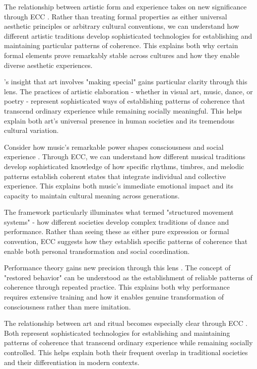 The relationship between artistic form and experience takes on new significance through ECC \cite{kaeppler1985structured}. Rather than treating formal properties as either universal aesthetic principles or arbitrary cultural conventions, we can understand how different artistic traditions develop sophisticated technologies for establishing and maintaining particular patterns of coherence. This explains both why certain formal elements prove remarkably stable across cultures and how they enable diverse aesthetic experiences.

\cite{dissanayake1992homo}'s insight that art involves "making special" gains particular clarity through this lens. The practices of artistic elaboration - whether in visual art, music, dance, or poetry - represent sophisticated ways of establishing patterns of coherence that transcend ordinary experience while remaining socially meaningful. This helps explain both art's universal presence in human societies and its tremendous cultural variation.

Consider how music's remarkable power shapes consciousness and social experience \cite{feld1982sound}. Through ECC, we can understand how different musical traditions develop sophisticated knowledge of how specific rhythms, timbres, and melodic patterns establish coherent states that integrate individual and collective experience. This explains both music's immediate emotional impact and its capacity to maintain cultural meaning across generations.

The framework particularly illuminates what \cite{kaeppler1985structured} termed "structured movement systems" - how different societies develop complex traditions of dance and performance. Rather than seeing these as either pure expression or formal convention, ECC suggests how they establish specific patterns of coherence that enable both personal transformation and social coordination.

Performance theory gains new precision through this lens \cite{schechner1985between}. The concept of "restored behavior" can be understood as the establishment of reliable patterns of coherence through repeated practice. This explains both why performance requires extensive training and how it enables genuine transformation of consciousness rather than mere imitation.

The relationship between art and ritual becomes especially clear through ECC \cite{turner1982ritual}. Both represent sophisticated technologies for establishing and maintaining patterns of coherence that transcend ordinary experience while remaining socially controlled. This helps explain both their frequent overlap in traditional societies and their differentiation in modern contexts.

